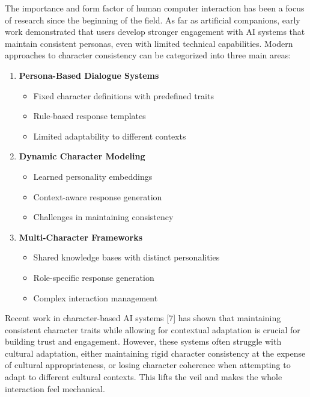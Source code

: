 \documentclass[
]{article}
\providecommand{\tightlist}{%
  \setlength{\itemsep}{0pt}\setlength{\parskip}{0pt}}
\begin{document}
The importance and form factor of human computer interaction has been a
focus of research since the beginning of the field. As far as artificial companions, early work demonstrated that
users develop stronger engagement with AI systems that maintain
consistent personas, even with limited technical capabilities. Modern
approaches to character consistency can be categorized into three main
areas:

\begin{enumerate}
\def\labelenumi{\arabic{enumi}.}
\tightlist
\item
  \textbf{Persona-Based Dialogue Systems}

  \begin{itemize}
  \tightlist
  \item
    Fixed character definitions with predefined traits
  \item
    Rule-based response templates
  \item
    Limited adaptability to different contexts
  \end{itemize}
\item
  \textbf{Dynamic Character Modeling}

  \begin{itemize}
  \tightlist
  \item
    Learned personality embeddings
  \item
    Context-aware response generation
  \item
    Challenges in maintaining consistency
  \end{itemize}
\item
  \textbf{Multi-Character Frameworks}

  \begin{itemize}
  \tightlist
  \item
    Shared knowledge bases with distinct personalities
  \item
    Role-specific response generation
  \item
    Complex interaction management
  \end{itemize}
\end{enumerate}

Recent work in character-based AI systems {[}7{]} has shown that
maintaining consistent character traits while allowing for contextual
adaptation is crucial for building trust and engagement. However, these
systems often struggle with cultural adaptation, either maintaining
rigid character consistency at the expense of cultural appropriateness,
or losing character coherence when attempting to adapt to different
cultural contexts. This lifts the veil and makes the whole interaction feel mechanical.
\end{document}
